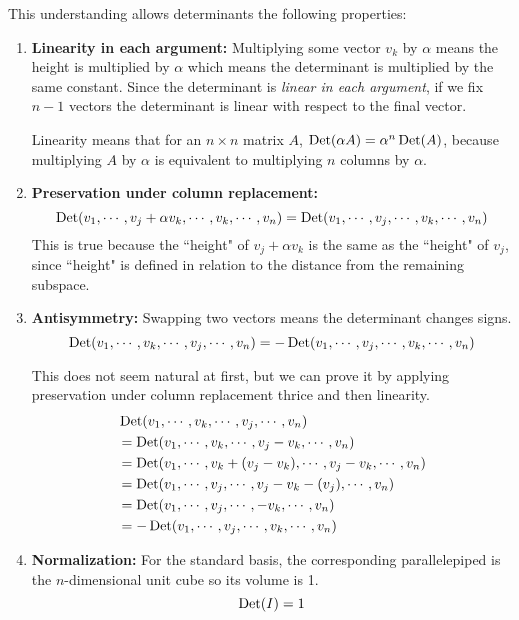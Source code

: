This understanding allows determinants the following properties: 
\begin{enumerate}
	\item \textbf{Linearity in each argument: } Multiplying some vector $v_{k}$ by $\alpha$ means the height is multiplied by $\alpha$ which means the determinant is multiplied by the same constant. Since the determinant is \textit{linear in each argument}, if we fix $n-1$ vectors the determinant is linear with respect to the final vector. 
	
	Linearity means that for an $n \times n$ matrix $A$,  $\operatorname{Det}(\alpha A) = \alpha^{n} \operatorname{Det}(A)$, because multiplying $A$ by $\alpha$ is equivalent to multiplying $n$ columns by $\alpha$. 
	\item \textbf{Preservation under column replacement: } 
	$$\operatorname{Det}(v_{1}, \cdots, v_{j} + \alpha v_{k}, \cdots, v_{k}, \cdots, v_{n}) = \operatorname{Det}(v_{1}, \cdots, v_{j}, \cdots, v_{k}, \cdots, v_{n})$$
	This is true because the ``height" of $v_{j} + \alpha v_{k}$ is the same as the ``height" of $v_{j}$, since ``height" is defined in relation to the distance from the remaining subspace. 
	\item \textbf{Antisymmetry: } Swapping two vectors means the determinant changes signs. 
	$$\operatorname{Det}(v_{1}, \cdots, v_{k}, \cdots, v_{j}, \cdots, v_{n}) = -\operatorname{Det}(v_{1}, \cdots, v_{j}, \cdots, v_{k}, \cdots, v_{n})$$
	
This does not seem natural at first, but we can prove it by applying preservation under column replacement thrice and then linearity. 
$$ 
\begin{aligned}
&\operatorname{Det}(v_{1}, \cdots, v_{k}, \cdots, v_{j}, \cdots, v_{n}) \\ 
&= \operatorname{Det}(v_{1}, \cdots, v_{k}, \cdots, v_{j} - v_{k}, \cdots, v_{n}) \\
&= \operatorname{Det}(v_{1}, \cdots, v_{k} + (v_{j} - v_{k}), \cdots, v_{j} - v_{k}, \cdots, v_{n}) \\
&= \operatorname{Det}(v_{1}, \cdots, v_{j}, \cdots, v_{j} - v_{k} - (v_{j}), \cdots, v_{n}) \\
&= \operatorname{Det}(v_{1}, \cdots, v_{j}, \cdots, -v_{k}, \cdots, v_{n}) \\
&= -\operatorname{Det}(v_{1}, \cdots, v_{j}, \cdots, v_{k}, \cdots, v_{n}) 
\end{aligned}
$$

	\item \textbf{Normalization: } For the standard basis, the corresponding parallelepiped is the $n$-dimensional unit cube so its volume is 1. 
	$$\operatorname{Det}(I) = 1$$
\end{enumerate}

